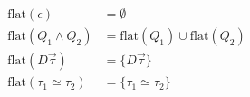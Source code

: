 \documentclass[12pt]{article}
\begin{document}
\pagestyle{empty}

\begin{align*}
    \mathrm{flat}(\epsilon) &= \emptyset \\
    \mathrm{flat}(Q_1 \land Q_2) &= \mathrm{flat}(Q_1) \cup \mathrm{flat}(Q_2) \\
    \mathrm{flat}(D \vec{\tau}) &= \{D \vec{\tau}\} \\
    \mathrm{flat}(\tau_1 \simeq \tau_2) &= \{\tau_1 \simeq \tau_2\}
\end{align*}
\end{document}
